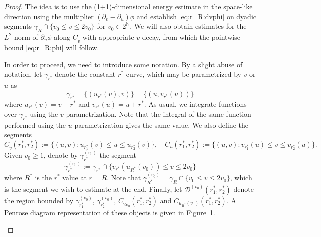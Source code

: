 \documentclass[12 pt, reqno]{amsart}
\theoremstyle{definition}
\theoremstyle{remark}
\numberwithin{equation}{section}
\newcommand{\set}[1]{\{#1\}}
\newcommand{\rd}{\partial}
\newcommand{\0}{\emptyset}
\newcommand{\gmm}{\gamma}
\newcommand{\bbN}{\mathbb N}
\newcommand{\calD}{\mathcal D}
\newcommand{\uC}{\underline{C}}
\begin{document}
\begin{proof} 

The idea is to use the (1+1)-dimensional energy estimate in the space-like direction using the multiplier $(\rd_{v} - \rd_{u}) \phi$ and establish \eqref{eq:r=R:dvphi} on dyadic segments $\gmm_{R} \cap \set{v_{0} \leq v \leq 2 v_{0}}$ for $v_{0} \in 2^{\bbN}$. We will also obtain estimates for the $L^2$ norm of $\rd_u\phi$ along $\underline C_v$ with appropriate $v$-decay, from which the pointwise bound \eqref{eq:r=R:phi} will follow.


In order to proceed, we need to introduce some notation. By a slight abuse of notation, let $\gmm_{r^{\ast}}$ denote the constant $r^{\ast}$ curve, which may be parametrized by $v$ or $u$ as
\begin{equation*}
	\gmm_{r^{\ast}} = \set{(u_{r^{\ast}}(v), v)} = \set{(u, v_{r^{\ast}}(u))}
\end{equation*}
where $u_{r^{\ast}}(v) = v - r^{\ast}$ and $v_{r^{\ast}}(u) = u + r^{\ast}$. 
As usual, we integrate functions over $\gmm_{r^{\ast}}$ using the $v$-parametrization. Note that the integral of the same function performed using the $u$-parametrization gives the same value.
We also define the segments
\begin{equation*}
	\uC_{v}(r^{\ast}_{1}, r^{\ast}_{2}) := \set{(u, v) : u_{r^{\ast}_{1}}(v) \leq u \leq u_{r^{\ast}_{2}}(v)}, \quad
	C_{u}(r^{\ast}_{1}, r^{\ast}_{2}) := \set{(u, v) : v_{r^{\ast}_{1}}(u) \leq v \leq v_{r^{\ast}_{2}}(u)}.
\end{equation*}
Given $v_{0} \geq 1$, denote by $\gmm^{(v_{0})}_{r^{\ast}}$ the segment
\begin{equation*}
	\gmm^{(v_{0})}_{r^{\ast}} := \gmm_{r^{\ast}} \cap \set{v_{r^{\ast}}(u_{R^{\ast}}(v_{0})) \leq v \leq 2 v_{0}}
\end{equation*}
where $R^{\ast}$ is the $r^{\ast}$ value at $r = R$. Note that $\gmm^{(v_{0})}_{R^{\ast}} = \gmm_{R} \cap \set{v_{0} \leq v \leq 2v_{0}}$, which is the segment we wish to estimate at the end. Finally, let $\calD^{(v_{0})}(r^{\ast}_{1}, r^{\ast}_{2})$ denote the region bounded by $\gmm^{(v_{0})}_{r^{\ast}_{1}}$, $\gmm^{(v_{0})}_{r^{\ast}_{2}}$, $\uC_{2v_{0}}(r^{\ast}_{1}, r^{\ast}_{2})$ and $C_{u_{R^{\ast}}(v_{0})}(r^{\ast}_{1}, r^{\ast}_{2})$. A Penrose diagram representation of these objects is given in Figure~\ref{fig:no-shift}.

\begin{figure}[h]
\begin{center}
\def\svgwidth{220px}
 
\caption{} \label{fig:no-shift}
\end{center}
\end{figure}



\end{proof}
\end{document}
